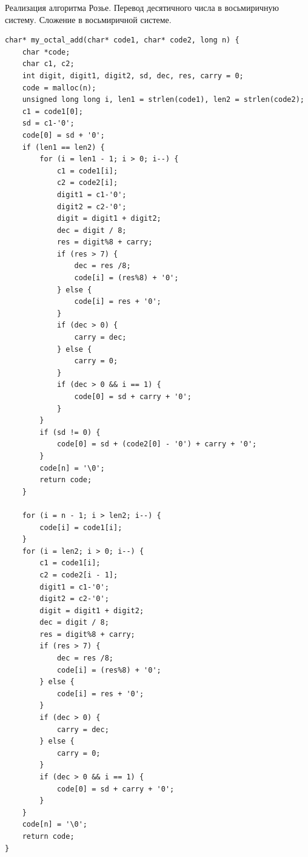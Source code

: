 \documentclass[14pt, russian]{scrartcl}
\begin{document}
\newpage
\begin{code}
\caption{Реализация алгоритма Розье. Перевод десятичного числа в восьмиричную систему. Сложение в восьмиричной системе.}
\label{lst:octaladd}
\begin{verbatim}
char* my_octal_add(char* code1, char* code2, long n) {
    char *code;
    char c1, c2;
    int digit, digit1, digit2, sd, dec, res, carry = 0;
    code = malloc(n);
    unsigned long long i, len1 = strlen(code1), len2 = strlen(code2);
    c1 = code1[0];
    sd = c1-'0';
    code[0] = sd + '0';
    if (len1 == len2) {
        for (i = len1 - 1; i > 0; i--) {
            c1 = code1[i];
            c2 = code2[i];
            digit1 = c1-'0'; 
            digit2 = c2-'0'; 
            digit = digit1 + digit2;
            dec = digit / 8;
            res = digit%8 + carry;
            if (res > 7) {
                dec = res /8;
                code[i] = (res%8) + '0';
            } else {
                code[i] = res + '0';
            }
            if (dec > 0) {
                carry = dec;
            } else {
                carry = 0;
            }
            if (dec > 0 && i == 1) {
                code[0] = sd + carry + '0';
            }
        } 
        if (sd != 0) {
            code[0] = sd + (code2[0] - '0') + carry + '0';
        }
        code[n] = '\0';
        return code;
    }

    for (i = n - 1; i > len2; i--) {
        code[i] = code1[i];
    }
    for (i = len2; i > 0; i--) {
        c1 = code1[i];
        c2 = code2[i - 1];
        digit1 = c1-'0'; 
        digit2 = c2-'0'; 
        digit = digit1 + digit2;
        dec = digit / 8;
        res = digit%8 + carry;
        if (res > 7) {
            dec = res /8;
            code[i] = (res%8) + '0';
        } else {
            code[i] = res + '0';
        }
        if (dec > 0) {
            carry = dec;
        } else {
            carry = 0;
        }
        if (dec > 0 && i == 1) {
            code[0] = sd + carry + '0';
        }
    } 
    code[n] = '\0';
    return code;
}
\end{verbatim}
\end{code}
\end{document}
